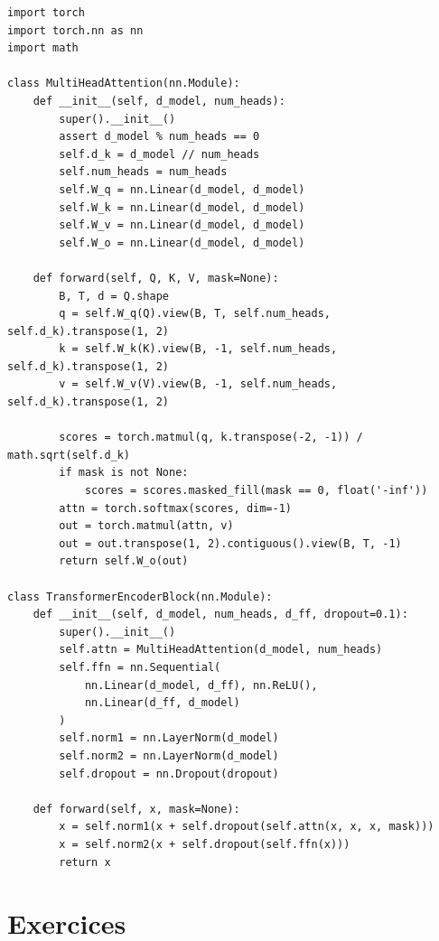 \begin{codeblock}[title=\textbf{Bloc Transformer encodeur en PyTorch}]
\begin{verbatim}
import torch
import torch.nn as nn
import math

class MultiHeadAttention(nn.Module):
    def __init__(self, d_model, num_heads):
        super().__init__()
        assert d_model % num_heads == 0
        self.d_k = d_model // num_heads
        self.num_heads = num_heads
        self.W_q = nn.Linear(d_model, d_model)
        self.W_k = nn.Linear(d_model, d_model)
        self.W_v = nn.Linear(d_model, d_model)
        self.W_o = nn.Linear(d_model, d_model)

    def forward(self, Q, K, V, mask=None):
        B, T, d = Q.shape
        q = self.W_q(Q).view(B, T, self.num_heads, self.d_k).transpose(1, 2)
        k = self.W_k(K).view(B, -1, self.num_heads, self.d_k).transpose(1, 2)
        v = self.W_v(V).view(B, -1, self.num_heads, self.d_k).transpose(1, 2)

        scores = torch.matmul(q, k.transpose(-2, -1)) / math.sqrt(self.d_k)
        if mask is not None:
            scores = scores.masked_fill(mask == 0, float('-inf'))
        attn = torch.softmax(scores, dim=-1)
        out = torch.matmul(attn, v)
        out = out.transpose(1, 2).contiguous().view(B, T, -1)
        return self.W_o(out)

class TransformerEncoderBlock(nn.Module):
    def __init__(self, d_model, num_heads, d_ff, dropout=0.1):
        super().__init__()
        self.attn = MultiHeadAttention(d_model, num_heads)
        self.ffn = nn.Sequential(
            nn.Linear(d_model, d_ff), nn.ReLU(),
            nn.Linear(d_ff, d_model)
        )
        self.norm1 = nn.LayerNorm(d_model)
        self.norm2 = nn.LayerNorm(d_model)
        self.dropout = nn.Dropout(dropout)

    def forward(self, x, mask=None):
        x = self.norm1(x + self.dropout(self.attn(x, x, x, mask)))
        x = self.norm2(x + self.dropout(self.ffn(x)))
        return x
\end{verbatim}
\end{codeblock}

\section{Exercices}
\label{sec:att:exercices}

